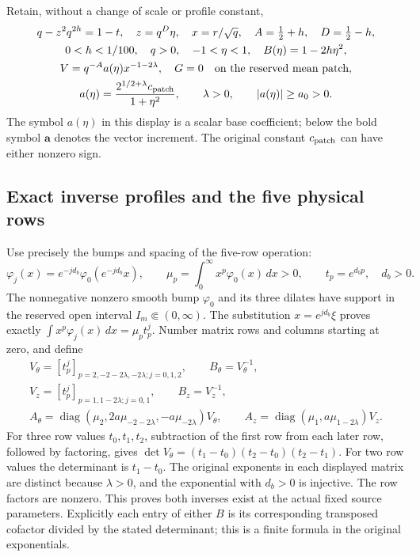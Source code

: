 Retain, without a change of scale or profile constant,
\begin{equation}\label{mcmean:original_scale}
\begin{gathered}
 q-z^2q^{2h}=1-t,\quad z=q^D\eta,\quad x=r/\sqrt q,\quad
 A=\tfrac12+h,\quad D=\tfrac12-h,\\
 0<h<1/100,\quad q>0,\quad -1<\eta<1,\quad
 B(\eta)=1-2h\eta^2,\\
 V=q^{-A}a(\eta)x^{-1-2\lambda},\quad G=0
 \quad\hbox{on the reserved mean patch},\\
 a(\eta)=\frac{2^{1/2+\lambda}c_{\rm patch}}{1+\eta^2},
 \qquad \lambda>0,\qquad |a(\eta)|\ge a_0>0.
\end{gathered}
\end{equation}
The symbol \(a(\eta)\) in this display is a scalar base coefficient;
below the bold symbol \(\boldsymbol a\) denotes the vector increment.
The original constant \(c_{\rm patch}\) can have either nonzero sign.

\subsection{Exact inverse profiles and the five physical rows}

Use precisely the bumps and spacing of the five-row operation:
\[
 \varphi_j(x)=e^{-jd_b}\varphi_0(e^{-jd_b}x),\qquad
 \mu_p=\int_0^\infty x^p\varphi_0(x)\,dx>0,
 \qquad t_p=e^{d_bp},\quad d_b>0.
\]
The nonnegative nonzero smooth bump \(\varphi_0\) and its three
dilates have support in the reserved open interval \(I_m\Subset(0,\infty)\).
The substitution \(x=e^{jd_b}\xi\) proves exactly
\(\int x^p\varphi_j(x)\,dx=\mu_p t_p^j\).
Number matrix rows and columns starting at zero, and define
\begin{equation}\label{mcmean:vandermonde}
\begin{gathered}
 V_\theta=[t_p^j]_{p=2,-2-2\lambda,-2\lambda; j=0,1,2},
 \qquad B_\theta=V_\theta^{-1},\\
 V_z=[t_p^j]_{p=1,1-2\lambda; j=0,1},
 \qquad B_z=V_z^{-1},\\
 A_\theta=\operatorname{diag}
  (\mu_2,2a\mu_{-2-2\lambda},-a\mu_{-2\lambda})V_\theta,
 \qquad
 A_z=\operatorname{diag}(\mu_1,a\mu_{1-2\lambda})V_z.
\end{gathered}
\end{equation}
For three row values \(t_0,t_1,t_2\), subtraction of the first row
from each later row, followed by factoring, gives
\(\det V_\theta=(t_1-t_0)(t_2-t_0)(t_2-t_1)\).
For two row values the determinant is \(t_1-t_0\).
The original exponents in each displayed matrix are distinct because
\(\lambda>0\), and the exponential with \(d_b>0\) is injective.
The row factors are nonzero. This proves both inverses exist at the
actual fixed source parameters. Explicitly each entry of either
\(B\) is its corresponding transposed cofactor divided by the stated
determinant; this is a finite formula in the original exponentials.

